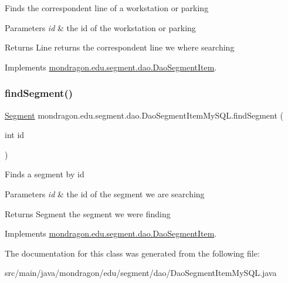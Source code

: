 Finds the correspondent line of a workstation or parking


\begin{DoxyParams}{Parameters}
{\em id} & the id of the workstation or parking \\
\hline
\end{DoxyParams}
\begin{DoxyReturn}{Returns}
Line returns the correspondent line we where searching 
\end{DoxyReturn}


Implements \mbox{\hyperlink{interfacemondragon_1_1edu_1_1segment_1_1dao_1_1_dao_segment_item}{mondragon.\+edu.\+segment.\+dao.\+Dao\+Segment\+Item}}.

\mbox{\label{classmondragon_1_1edu_1_1segment_1_1dao_1_1_dao_segment_item_my_s_q_l_aa3f1cdd2a4bee4fe9bf0da57adfa949f}} 
\subsubsection{\texorpdfstring{findSegment()}{findSegment()}}
{\footnotesize\ttfamily \mbox{\hyperlink{classmondragon_1_1edu_1_1clases_1_1_segment}{Segment}} mondragon.\+edu.\+segment.\+dao.\+Dao\+Segment\+Item\+My\+S\+Q\+L.\+find\+Segment (\begin{DoxyParamCaption}\item[{int}]{id }\end{DoxyParamCaption})\hspace{0.3cm}{\ttfamily [inline]}}

Finds a segment by id


\begin{DoxyParams}{Parameters}
{\em id} & the id of the segment we are searching \\
\hline
\end{DoxyParams}
\begin{DoxyReturn}{Returns}
Segment the segment we were finding 
\end{DoxyReturn}


Implements \mbox{\hyperlink{interfacemondragon_1_1edu_1_1segment_1_1dao_1_1_dao_segment_item}{mondragon.\+edu.\+segment.\+dao.\+Dao\+Segment\+Item}}.



The documentation for this class was generated from the following file\+:\begin{DoxyCompactItemize}
\item 
src/main/java/mondragon/edu/segment/dao/Dao\+Segment\+Item\+My\+S\+Q\+L.\+java\end{DoxyCompactItemize}
